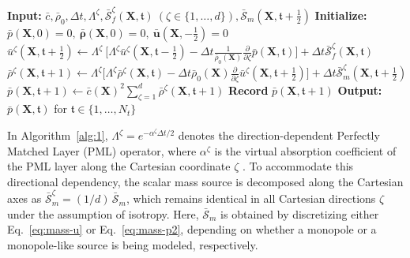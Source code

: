 \documentclass[11pt,reqno]{amsart}
\theoremstyle{remark}
\theoremstyle{italic_lemma}
\newcommand{\bt}{\mathfrak{t}}
\newcommand{\bu}{\boldsymbol{u}}
\newcommand{\bro}{\boldsymbol{\rho}}
\newcommand{\bX}{\boldsymbol{X}}
\begin{document}
\begin{algorithm}
    \caption{Full-discretization at time step \( \bt \in \{0, \ldots, N_t-1\} \)}
    \label{alg:1}
    \begin{algorithmic}[1]
        \State \textbf{Input:} \( \bar{c}, \bar{\rho}_0, \Delta t, \Lambda^\zeta, \bar{\mathcal{S}}_f^{\zeta}(\bX, \bt) \ (\zeta \in \{1, \ldots, d\}), \bar{\mathcal{S}}_m(\bX, \bt+\frac{1}{2})  \)
        \State \textbf{Initialize:} \( \bar{p}(\bX, 0) = 0, \ \bar{\bro}(\bX, 0) = 0, \ \bar{\bu}(\bX, -\frac{1}{2}) = 0 \)  
        \For{\( \bt = 0, \ldots, N_t-1 \)}
            \State \( \bar{u}^\zeta (\bX,\bt + \frac{1}{2})  \gets \Lambda^\zeta \ \Big[\Lambda^\zeta \bar{u}^\zeta(\bX, \bt -\frac{1}{2}) - \Delta t \frac{1}{\bar{\rho}_0(\bX)} \frac{\partial}{\partial \zeta} \bar{p}(\bX, \bt)\Big] 
            + \Delta t \bar{\mathcal{S}}_f^{\zeta} (\bX, \bt) \) \Comment{Update \( \bu \)}
            \State \( \bar{\rho}^\zeta(\bX, \bt+1)  \gets \Lambda^\zeta \Big[\Lambda^\zeta \bar{\rho}^\zeta(\bX, \bt) - \Delta t \bar{\rho}_0(\bX) \frac{\partial}{\partial \zeta} \bar{u}^\zeta(\bX, \bt+\frac{1}{2})\Big] + \Delta t \bar{\mathcal{S}}_m^\zeta (\bX, \bt+\frac{1}{2}) \) 
            \State \( \bar{p}(\bX, \bt+1) \gets \bar{c}(\bX)^2 \sum_{\zeta = 1}^d \bar{\rho}^\zeta (\bX, \bt+1) \) 
            \State \textbf{Record} \( \bar{p}(\bX, \bt+1 ) \)
        \EndFor
        \State \textbf{Output:} \( \bar{p}(\bX, \bt) \) for \( \bt \in \{1, \ldots, N_t\} \) 
    \end{algorithmic}
\end{algorithm}


In Algorithm~\ref{alg:1}, \( \Lambda^\zeta = e^{-\alpha^\zeta \Delta t / 2} \) denotes 
the direction-dependent Perfectly Matched Layer (PML) operator, where \( \alpha^\zeta \) 
is the virtual absorption coefficient of the PML layer along the Cartesian coordinate \( \zeta \) \cite{Mast,Tabei,Treeby}. To accommodate this directional dependency, the scalar mass source is decomposed along the Cartesian axes as 
\( \bar{\mathcal{S}}_m^\zeta = (1/d)\, \bar{\mathcal{S}}_m \), which remains identical in 
all Cartesian directions \( \zeta \) under the assumption of isotropy. Here, 
\( \bar{\mathcal{S}}_m \) is obtained by discretizing either 
Eq.~\eqref{eq:mass-u} or Eq.~\eqref{eq:mass-p2}, depending on whether a monopole or a 
monopole-like source is being modeled, respectively.
\end{document}
